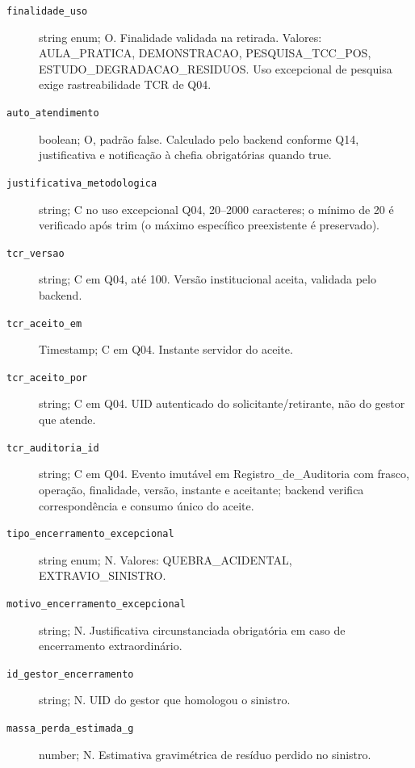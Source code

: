 \begin{description}
\item[\texttt{finalidade\_uso}] string enum; O. Finalidade validada na retirada. Valores: AULA\_PRATICA, DEMONSTRACAO, PESQUISA\_TCC\_POS, ESTUDO\_DEGRADACAO\_RESIDUOS. Uso excepcional de pesquisa exige rastreabilidade TCR de Q04.
\item[\texttt{auto\_atendimento}] boolean; O, padrão false. Calculado pelo backend conforme Q14, justificativa e notificação à chefia obrigatórias quando true.
\item[\texttt{justificativa\_metodologica}] string; C no uso excepcional Q04, 20--2000 caracteres; o mínimo de 20 é verificado após trim (o máximo específico preexistente é preservado).
\item[\texttt{tcr\_versao}] string; C em Q04, até 100. Versão institucional aceita, validada pelo backend.
\item[\texttt{tcr\_aceito\_em}] Timestamp; C em Q04. Instante servidor do aceite.
\item[\texttt{tcr\_aceito\_por}] string; C em Q04. UID autenticado do solicitante/retirante, não do gestor que atende.
\item[\texttt{tcr\_auditoria\_id}] string; C em Q04. Evento imutável em Registro\_de\_Auditoria com frasco, operação, finalidade, versão, instante e aceitante; backend verifica correspondência e consumo único do aceite.
\item[\texttt{tipo\_encerramento\_excepcional}] string enum; N. Valores: QUEBRA\_ACIDENTAL, EXTRAVIO\_SINISTRO.
\item[\texttt{motivo\_encerramento\_excepcional}] string; N. Justificativa circunstanciada obrigatória em caso de encerramento extraordinário.
\item[\texttt{id\_gestor\_encerramento}] string; N. UID do gestor que homologou o sinistro.
\item[\texttt{massa\_perda\_estimada\_g}] number; N. Estimativa gravimétrica de resíduo perdido no sinistro.
\end{description}

